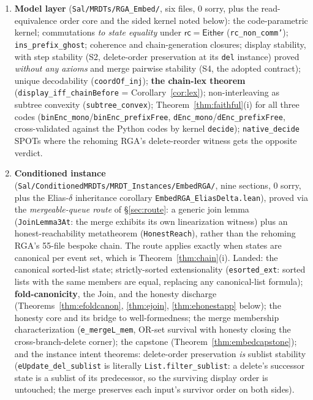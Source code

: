\documentclass[11pt]{article}
\newcommand{\rcrel}{\mathsf{rc}}                 %
\newcommand{\code}[1]{\texttt{#1}}
\newcommand{\Either}{\textsf{Either}}
\begin{document}
\begin{enumerate}
\item \textbf{Model layer} (\code{Sal/MRDTs/RGA\_Embed/}, six
files, 0 sorry, plus the read-equivalence order core and the sided
kernel noted below): the code-parametric kernel; commutations \emph{to
state equality} under $\rcrel = \Either$ (\code{rc\_non\_comm'});
\code{ins\_prefix\_ghost}; coherence and chain-generation closures;
display stability, with step stability (S2, delete-order preservation at
its \code{del} instance) proved \emph{without any axioms} and merge pairwise
stability (S4, the adopted contract); unique decodability
(\code{coordOf\_inj}); \textbf{the chain-lex theorem}
(\code{display\_iff\_chainBefore} = Corollary~\ref{cor:lex});
non-interleaving as subtree convexity (\code{subtree\_convex});
Theorem~\ref{thm:faithful}(i) for all three codes
(\code{binEnc\_mono}/\code{binEnc\_prefixFree},
\code{dEnc\_mono}/\code{dEnc\_prefixFree}, cross-validated
against the Python codes by kernel \code{decide});
\code{native\_decide} SPOTs where the rehoming RGA's delete-reorder
witness gets the opposite verdict.
\item \textbf{Conditioned instance}
(\code{Sal/ConditionedMRDTs/MRDT\_Instances/EmbedRGA/}, nine
sections, 0 sorry, plus the Elias-$\delta$ inheritance corollary
\code{EmbedRGA\_EliasDelta.lean}), proved via the \emph{mergeable-queue
route} of \S\ref{sec:route}: a
generic join lemma (\code{JoinLemma3At}: the merge exhibits its own
linearization witness) plus an honest-reachability metatheorem
(\code{HonestReach}), rather than the rehoming RGA's 55-file bespoke
chain. The route applies exactly when states are canonical per event
set, which is Theorem~\ref{thm:chain}(i).
Landed: the canonical sorted-list state; strictly-sorted
extensionality (\code{esorted\_ext}: sorted lists with the same
members are equal, replacing any canonical-list formula);
\textbf{fold-canonicity}, the Join, and the honesty discharge
(Theorems~\ref{thm:efoldcanon}, \ref{thm:ejoin},
\ref{thm:ehonestapp} below); the honesty core and its bridge to
well-formedness; the merge membership characterization
(\code{e\_mergeL\_mem}, OR-set survival with honesty closing the
cross-branch-delete corner); the capstone
(Theorem~\ref{thm:embedcapstone}); and the instance intent theorems:
delete-order preservation \emph{is} sublist stability
(\code{eUpdate\_del\_sublist} is literally
\code{List.filter\_sublist}: a delete's successor state is a sublist
of its predecessor, so the surviving display order is untouched;
the merge preserves each input's survivor order on both sides).
\end{enumerate}
\end{document}

